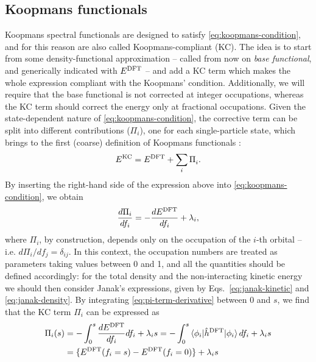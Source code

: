 \subsection{Koopmans functionals\label{sec:koopmans-functionals}}
Koopmans spectral functionals are designed to satisfy \cref{eq:koopmans-condition}, and for this reason are also called Koopmans-compliant (KC). The idea is to start from some density-functional approximation -- called from now on \emph{base functional}, and generically indicated with $E^{\rm DFT}$ -- and add a KC term which makes the whole expression compliant with the Koopmans' condition. Additionally, we will require that the base functional is not corrected at integer occupations, whereas the KC term should correct the energy only at fractional occupations. Given the state-dependent nature of \cref{eq:koopmans-condition}, the corrective term can be split into different contributions ($\Pi_i$), one for each single-particle state, which brings to the first (coarse) definition of Koopmans functionals  \cite{dabo_non-koopmans_2009,dabo_koopmans_2010}:
%
\begin{equation}
    E^{\rm KC} = E^{\rm DFT} + \sum_i \Pi_i^{\rm} .
    \label{eq:kc-functional-coarse}
\end{equation}
%
By inserting the right-hand side of the expression above into \cref{eq:koopmans-condition}, we obtain
%
\begin{equation}
    \frac{d\Pi_i}{df_i} = - \frac{dE^{\rm DFT}}{df_i} + \lambda_i ,
    \label{eq:pi-term-derivative}
\end{equation}
%
where $\Pi_i$, by construction, depends only on the occupation of the $i$-th orbital -- i.e. $d\Pi_i / df_j = \delta_{ij}$. In this context, the occupation numbers are treated as parameters taking values between 0 and 1, and all the quantities should be defined accordingly: for the total density and the non-interacting kinetic energy we should then consider Janak's expressions, given by Eqs.~\eqref{eq:janak-kinetic} and \eqref{eq:janak-density}. By integrating \cref{eq:pi-term-derivative} between 0 and $s$, we find that the KC term $\Pi_i$ can be expressed as
%
\begin{equation}
    \begin{split}
    \Pi_i(s) &= - \int_0^{s} \frac{dE^{\rm DFT}}{df_i} df_i + \lambda_i s =
    - \int_0^{s} \braket{\phi_i|\hat{h}^{\rm DFT}|\phi_i} df_i + \lambda_i s \\
    &= \{ E^{\rm DFT}(f_i=s) - E^{\rm DFT}(f_i=0) \} + \lambda_i s
    \end{split}
    \label{eq:pi-term-general}
\end{equation}
